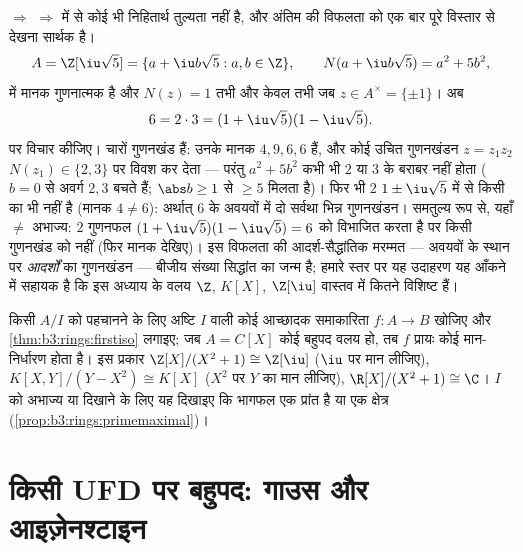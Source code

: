 \begin{example}
\label{ex:b3:rings:nonufd}
 $\Rightarrow$  $\Rightarrow$  में से कोई भी निहितार्थ तुल्यता
नहीं है, और अंतिम की विफलता को एक बार पूरे विस्तार से देखना
सार्थक है।
\[
A = \Z[\iu\sqrt5] = \{a + \iu b\sqrt5 : a, b \in \Z\},
\qquad N(a + \iu b\sqrt5) = a^2 + 5b^2,
\]
में मानक गुणनात्मक है और $N(z) = 1$ तभी और केवल तभी जब $z \in
A^\times = \{\pm1\}$। अब
\[
6 = 2 \cdot 3 = (1 + \iu\sqrt5)(1 - \iu\sqrt5).
\]
पर विचार कीजिए। चारों गुणनखंड  हैं: उनके मानक $4, 9, 6,
6$ हैं,
और कोई उचित गुणनखंडन $z = z_1z_2$ $N(z_1) \in \{2, 3\}$ पर विवश कर देता --- परंतु
$a^2 + 5b^2$ कभी भी $2$ या $3$ के बराबर नहीं होता ($b = 0$ से
अवर्ग $2, 3$ बचते हैं; $\abs b \geq
1$ से $\geq 5$ मिलता है)। फिर भी $2$
$1 \pm
\iu\sqrt5$ में से किसी का भी  नहीं है (मानक $4 \neq 6$): अर्थात्
$6$ के  अवयवों में दो सर्वथा भिन्न गुणनखंडन। समतुल्य
रूप से, यहाँ  $\neq$ अभाज्य: $2$ गुणनफल $(1 +
\iu\sqrt5)(1 - \iu\sqrt5) = 6$ को
विभाजित करता है पर किसी गुणनखंड को नहीं (फिर मानक देखिए)। इस
विफलता की आदर्श-सैद्धांतिक मरम्मत --- अवयवों के स्थान पर
\emph{आदर्शों} का गुणनखंडन --- बीजीय संख्या सिद्धांत का जन्म है;
हमारे स्तर पर यह उदाहरण यह आँकने में सहायक है कि इस अध्याय के
 वलय $\Z$, $K[X]$, $\Z[\iu]$ वास्तव में कितने विशिष्ट हैं।
\end{example}

\begin{method}\label{met:b3:rings:quotient}
किसी  $A/I$ को पहचानने के लिए अष्टि $I$ वाली कोई
आच्छादक समाकारिता $f \colon A \to B$ खोजिए और \cref{thm:b3:rings:firstiso} लगाइए; जब $A = C[X]$ कोई बहुपद
वलय हो, तब $f$ प्रायः कोई मान-निर्धारण होता है। इस प्रकार
$\Z[X]/(X^2+1) \cong
\Z[\iu]$ ($\iu$ पर मान लीजिए), $K[X,Y]/(Y - X^2) \cong K[X]$ ($X^2$ पर $Y$ का मान
लीजिए), $\R[X]/(X^2+1) \cong \C$। $I$ को अभाज्य या  दिखाने के लिए यह
दिखाइए कि भागफल एक प्रांत है या एक क्षेत्र (\cref{prop:b3:rings:primemaximal})।
\end{method}

\section{किसी UFD पर बहुपद: गाउस और आइज़ेनश्टाइन}


